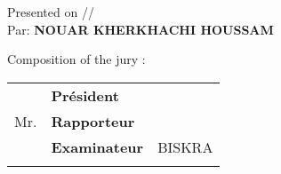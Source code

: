 \documentclass[12pt,oneside,frensh]{book}
\providecommand{\tabularnewline}{\\}
\begin{document}
\begin{titlepage}
\begin{center}
\par\end{center}

\begin{center}
Presented on \quad{}/\quad{}/\quad{}\\
Par: \textbf{NOUAR KHERKHACHI HOUSSAM}
\par\end{center}

\begin{center}
\vspace*{1.5cm}

\par\end{center}

Composition of the jury :\\
 

\begin{minipage}[t]{1\columnwidth}%
\begin{tabular}{lll}
 & \textbf{\small{}Président} & \tabularnewline
Mr.  & \textbf{\small{}Rapporteur} & \tabularnewline
 & \textbf{\small{}Examinateur} & {\small{}BISKRA }\tabularnewline
 &  & \tabularnewline
\end{tabular}%
\end{minipage}

\end{titlepage}
\end{document}
